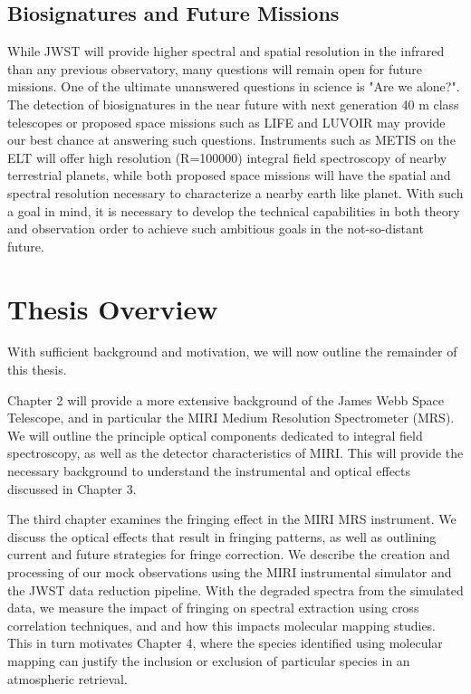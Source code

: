 \subsection{Biosignatures and Future Missions}
While JWST will provide higher spectral and spatial resolution in the infrared than any previous observatory, many questions will remain open for future missions.
One of the ultimate unanswered questions in science is "Are we alone?".
The detection of biosignatures in the near future with next generation 40 m class telescopes \parencite{Lopez-Morales2019} or proposed space missions such as LIFE \parencite{Quanz2019} and LUVOIR \parencite{Luvoir2019} may provide our best chance at answering such questions.
Instruments such as METIS on the ELT will offer high resolution (R=100000) integral field spectroscopy of nearby terrestrial planets, while both proposed space missions will have the spatial and spectral resolution necessary to characterize a nearby earth like planet.
With such a goal in mind, it is necessary to develop the technical capabilities in both theory and observation order to achieve such ambitious goals in the not-so-distant future.

\section{Thesis Overview}
With sufficient background and motivation, we will now outline the remainder of this thesis.

Chapter 2 will provide a more extensive background of the James Webb Space Telescope, and in particular the MIRI Medium Resolution Spectrometer (MRS).
We will outline the principle optical components dedicated to integral field spectroscopy, as well as the detector characteristics of MIRI.
This will provide the necessary background to understand the instrumental and optical effects discussed in Chapter 3.

The third chapter examines the fringing effect in the MIRI MRS instrument.
We discuss the optical effects that result in fringing patterns, as well as outlining current and future strategies for fringe correction.
We describe the creation and processing of our mock observations using the MIRI instrumental simulator and the JWST data reduction pipeline.
With the degraded spectra from the simulated data, we measure the impact of fringing on spectral extraction using cross correlation techniques, and and how this impacts molecular mapping studies.
This in turn motivates Chapter 4, where the species identified using molecular mapping can justify the inclusion or exclusion of particular species in an atmospheric retrieval.


